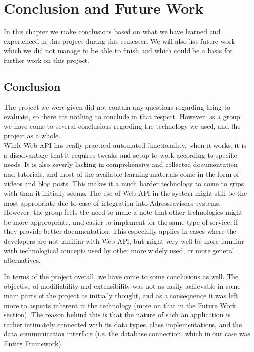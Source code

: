 \chapter{Conclusion and Future Work}
In this chapter we make conclusions based on what we have learned and experienced in this project during this semester. We will also list future work which we did not manage to be able to finish and which could be a basis for further work on this project. 
\newpage


\section{Conclusion}

The project we were given did not contain any questions regarding thing to evaluate, so there are nothing to conclude in that respect. However, as a group we have come to several conclusions regarding the technology we used, and the project as a whole.
\\
While Web API has really practical automated functionality, when it works, it is a disadvantage that it requires tweaks and setup to work according to specific needs. It is also severly lacking in comprehensive and collected documentation and tutorials, and most of the available learning materials come in the form of videos and blog posts. This makes it a much harder technology to come to grips with than it initially seems. The use of Web API in the system might still be the most appropriate due to ease of integration into Adresseavisens systems. However: the group feels the need to make a note that other technologies might be more apppropriate, and easier to implement for the same type of service, if they provide better documentation. This especially applies in cases where the developers are not familiar with Web API, but might very well be more familiar with technological concepts used by other more widely used, or more general alternatives.

In terms of the project overall, we have come to some conclusions as well. The objective of modifiability and extensibility was not as easily achievable in some main parts of the project as initially thought, and as a consequence it was left more to aspects inherent in the technology (more on that in the Future Work section). The reason behind this is that the nature of such an application is rather intimately connected with its data types, class implementations, and the data communication interface (i.e. the database connection, which in our case was Entity Framework).

